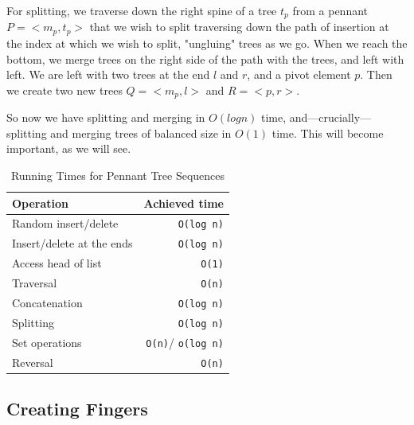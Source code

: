 \documentclass[sigconf]{acmart}
\begin{document}
For splitting, we traverse down the right spine of a tree $t_p$ from a pennant
$P = <m_p, t_p>$ that we wish to split traversing down the path of insertion at
the index at which we wish to split, "ungluing" trees as we go. When we reach
the bottom, we merge trees on the right side of the path with the trees, and
left with left. We are left with two trees at the end $l$ and $r$, and a pivot
element $p$. Then we create two new trees $Q = <m_p, l>$ and $R = <p, r>$.

So now we have splitting and merging in $O(log n)$ time, and---crucially---
splitting and merging trees of balanced size in $O(1)$ time. This will become
important, as we will see.


\begin{table}
    \caption{Running Times for Pennant Tree Sequences}
    \label{tab:pennant-run-times}
    \begin{tabular}{l|r}
            \toprule

            Operation     & Achieved time          \\
            \midrule
            Random insert/delete  & \texttt{O(log n)}             \\
            Insert/delete at the ends & \texttt{O(log n)}            \\
            Access head of list & \texttt{O(1)} \\
            Traversal       & \texttt{O(n)}                \\
            Concatenation   & \texttt{O(log n)}            \\
            Splitting       & \texttt{O(log n)}            \\
            Set operations  & \texttt{O(n)}\footnotemark[1]/
            \texttt{o(log n)}\footnotemark[2] \\
            Reversal        & \texttt{O(n)}                \\
            \bottomrule
        \end{tabular}
    \end{table}

\subsection{Creating Fingers}
\end{document}
